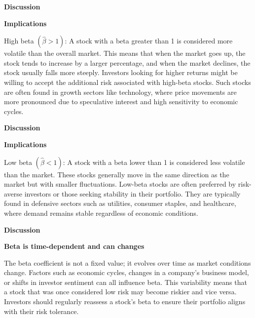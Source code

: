 \documentclass{beamer}
\begin{document}
\begin{frame}{\textbf{Discussion}}
	
\begin{block}{\textbf{Implications}}
	
	High beta \( (\widehat\beta>1) \): A stock with a beta greater than 1 is considered more volatile than the overall market. This means that when the market goes up, the stock tends to increase by a larger percentage, and when the market declines, the stock usually falls more steeply. Investors looking for higher returns might be willing to accept the additional risk associated with high-beta stocks. Such stocks are often found in growth sectors like technology, where price movements are more pronounced due to speculative interest and high sensitivity to economic cycles.
	
	
\end{block}

\end{frame}
\begin{frame}{\textbf{Discussion}}

\begin{block}{\textbf{Implications}}
	
	Low beta \( (\widehat\beta<1) \): A stock with a beta lower than 1 is considered less volatile than the market. These stocks generally move in the same direction as the market but with smaller fluctuations. Low-beta stocks are often preferred by risk-averse investors or those seeking stability in their portfolio. They are typically found in defensive sectors such as utilities, consumer staples, and healthcare, where demand remains stable regardless of economic conditions.
\end{block}

\end{frame}

\begin{frame}{\textbf{Discussion}}
\begin{block}{\textbf{Beta is time-dependent and can changes}}
	
	The beta coefficient is not a fixed value; it evolves over time as market conditions change. Factors such as economic cycles, changes in a company’s business model, or shifts in investor sentiment can all influence beta. This variability means that a stock that was once considered low risk may become riskier and vice versa. Investors should regularly reassess a stock's beta to ensure their portfolio aligns with their risk tolerance.
\end{block}
\end{frame}
\end{document}
